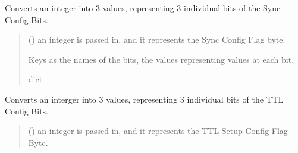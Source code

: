 \documentclass[letterpaper,10pt,english]{sphinxmanual}
\begin{document}
\begin{fulllineitems}

\begin{fulllineitems}
\label{\detokenize{Morelia.Devices:Morelia.Devices.PodDevice_8480SC.Pod8480SC.DecodeSyncConfigBits}}
\pysigstartsignatures
{}
\pysigstopsignatures
\sphinxAtStartPar
Converts an integer into 3 values, representing 3 individual bits of the Sync Config Bits.
\begin{quote}\begin{description}
\sphinxAtStartPar
{} () \textendash{} an integer is passed in, and it represents the Sync Config Flag byte.

\sphinxAtStartPar
Keys as the names of the bits, the values representing values at each bit.

\sphinxAtStartPar
dict

\end{description}\end{quote}

\end{fulllineitems}


\begin{fulllineitems}
\label{\detokenize{Morelia.Devices:Morelia.Devices.PodDevice_8480SC.Pod8480SC.DecodeTTlConfigBits}}
\pysigstartsignatures
{}
\pysigstopsignatures
\sphinxAtStartPar
Converts an interger into 3 values, representing 3 individual bits of the TTL Config Bits.
\begin{quote}\begin{description}
\sphinxAtStartPar
{} () \textendash{} an integer is passed in, and it represents the TTL Setup Config Flag Byte.


\end{description}
\end{quote}
\end{fulllineitems}
\end{fulllineitems}
\end{document}
